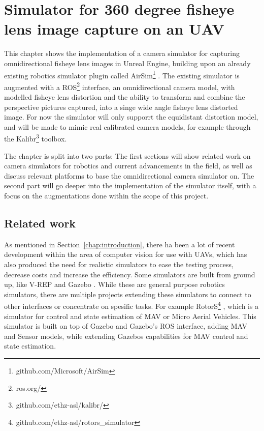 
\chapter{Simulator for 360 degree fisheye lens image capture on an UAV} \label{chap:simulator}

This chapter shows the implementation of a camera simulator for capturing omnidirectional fisheye lens images in Unreal Engine, building upon an already existing robotics simulator plugin called AirSim\footnote{github.com/Microsoft/AirSim} \cite{Airsim_paper}. The existing simulator is augmented with a ROS\footnote{ros.org/} interface, an omnidirectional camera model, with modelled fisheye lens distortion and the ability to transform and combine the perspective pictures captured, into a singe wide angle fisheye lens distorted image. For now the simulator will only supporrt the equidistant distortion model, and will be made to mimic real calibrated camera models, for example through the Kalibr\footnote{github.com/ethz-asl/kalibr/} toolbox.

The chapter is split into two parts: The first sections will show related work on camera simulators for robotics and current advancements in the field, as well as discuss relevant platforms to base the omnidirectional camera simulator on. The second part will go deeper into the implementation of the simulator itself, with a focus on the augmentations done within the scope of this project.

\section{Related work} \label{sec:simulator_related}

As mentioned in Section~\ref{chap:introduction}, there ha been a lot of recent development within the area of computer vision for use with UAVs, which has also produced the need for realistic simulators to ease the testing process, decrease costs and increase the efficiency. Some simulators are built from ground up, like V-REP \cite{VREP2013} and Gazebo \cite{GazeboPaper}. While these are general purpose robotics simulators, there are multiple projects extending these simulators to connect to other interfaces or concentrate on spesific tasks. For example RotorS\footnote{github.com/ethz-asl/rotors\_simulator} \cite{RotorS}, which is a simulator for control and state estimation of MAV or Micro Aerial Vehicles. This simulator is built on top of Gazebo and Gazebo's ROS interface, adding MAV and Sensor models, while extending Gazebos capabilities for MAV control and state estimation.

